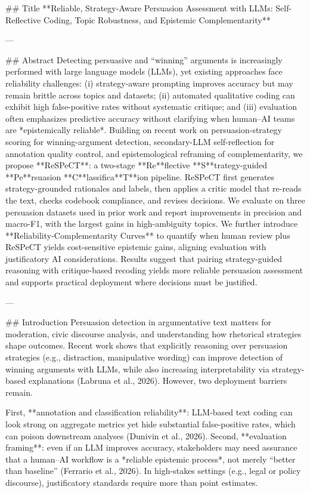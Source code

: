 ## Title  
**Reliable, Strategy-Aware Persuasion Assessment with LLMs: Self-Reflective Coding, Topic Robustness, and Epistemic Complementarity**

---

## Abstract  
Detecting persuasive and “winning” arguments is increasingly performed with large language models (LLMs), yet existing approaches face reliability challenges: (i) strategy-aware prompting improves accuracy but may remain brittle across topics and datasets; (ii) automated qualitative coding can exhibit high false-positive rates without systematic critique; and (iii) evaluation often emphasizes predictive accuracy without clarifying when human–AI teams are *epistemically reliable*. Building on recent work on persuasion-strategy scoring for winning-argument detection, secondary-LLM self-reflection for annotation quality control, and epistemological reframing of complementarity, we propose **ReSPeCT**: a two-stage **Re**flective **S**trategy-guided **Pe**rsuasion **C**lassifica**T**ion pipeline. ReSPeCT first generates strategy-grounded rationales and labels, then applies a critic model that re-reads the text, checks codebook compliance, and revises decisions. We evaluate on three persuasion datasets used in prior work and report improvements in precision and macro-F1, with the largest gains in high-ambiguity topics. We further introduce **Reliability-Complementarity Curves** to quantify when human review plus ReSPeCT yields cost-sensitive epistemic gains, aligning evaluation with justificatory AI considerations. Results suggest that pairing strategy-guided reasoning with critique-based recoding yields more reliable persuasion assessment and supports practical deployment where decisions must be justified.

---

## Introduction  
Persuasion detection in argumentative text matters for moderation, civic discourse analysis, and understanding how rhetorical strategies shape outcomes. Recent work shows that explicitly reasoning over persuasion strategies (e.g., distraction, manipulative wording) can improve detection of winning arguments with LLMs, while also increasing interpretability via strategy-based explanations (Labruna et al., 2026). However, two deployment barriers remain.

First, **annotation and classification reliability**: LLM-based text coding can look strong on aggregate metrics yet hide substantial false-positive rates, which can poison downstream analyses (Dunivin et al., 2026). Second, **evaluation framing**: even if an LLM improves accuracy, stakeholders may need assurance that a human–AI workflow is a *reliable epistemic process*, not merely “better than baseline” (Ferrario et al., 2026). In high-stakes settings (e.g., legal or policy discourse), justificatory standards require more than point estimates.

